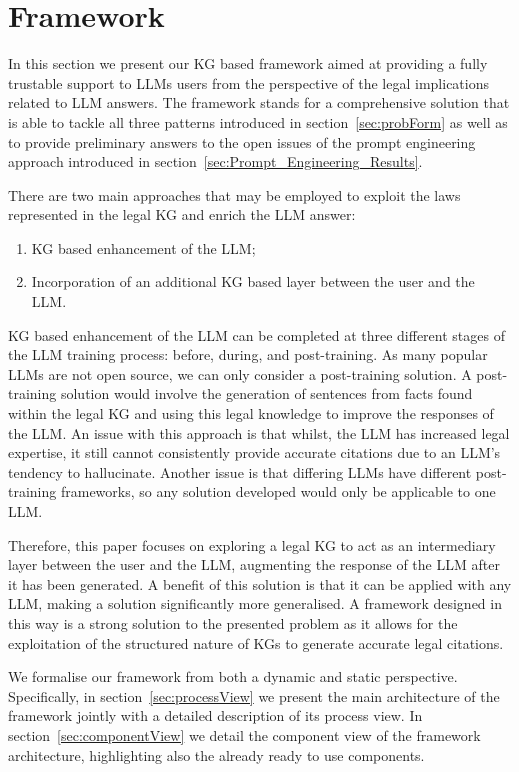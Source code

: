 \documentclass[sn-mathphys-num]{sn-jnl}%
\begin{document}
\section{Framework}\label{sec:framework}
In this section we present our KG based framework aimed at providing a fully %
trustable support to LLMs users from the perspective of the legal implications related to LLM answers.
%
The framework stands for a comprehensive solution that is able to tackle all three patterns introduced in section~\ref{sec:probForm} as well as to provide preliminary answers to the open issues of the prompt engineering approach introduced in section~\ref{sec:Prompt_Engineering_Results}.

There are two main approaches %
that may be employed to exploit the laws represented in the legal KG and enrich the LLM answer: 
\begin{enumerate}
    \item KG based enhancement of the LLM;
    \item Incorporation of an additional KG based layer between the user and the LLM.
\end{enumerate}
%
KG based enhancement of the LLM can be completed at three different stages of the LLM training process: before, during, and post-training. As many popular LLMs are not open source, we can only consider a post-training solution. A post-training solution would involve the generation of sentences from facts found within the legal KG and using this legal knowledge to improve the responses of the LLM. An issue with this approach is that whilst, the LLM has increased legal expertise, it still cannot consistently provide accurate citations due to an LLM's tendency to hallucinate. Another issue is that differing LLMs have different post-training frameworks, so any solution developed would only be applicable to one LLM.

Therefore, this paper focuses on  
exploring a legal KG to act as an intermediary layer between the user and the LLM, augmenting the response of the LLM after it has been generated. A benefit of this solution is that it can be applied with any LLM, making a solution significantly more generalised. A framework designed in this way is a strong solution to the presented problem as it allows for the exploitation of the structured nature of KGs to generate accurate legal citations.

We formalise our framework from both a dynamic and static perspective. Specifically, in section~\ref{sec:processView} we present the main architecture of the framework jointly with a detailed description of its process view. In section~\ref{sec:componentView} we detail the component view of the framework architecture, highlighting also the already ready to use components.
\end{document}
